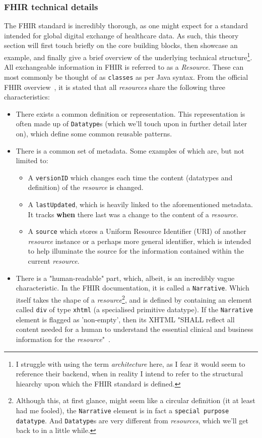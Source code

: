 \subsubsection*{FHIR technical details}
The FHIR standard is incredibly thorough, as one might expect for a standard intended for global digital exchange of healthcare data. As such, this theory section will first touch briefly on the core building blocks, then showcase an example, and finally give a brief overview of the underlying technical structure\footnote{I struggle with using the term \emph{architecture} here, as I fear it would seem to reference their backend, when in reality I intend to refer to the structural hiearchy upon which the FHIR standard is defined.}.
\\ 
All exchangeable information in FHIR is referred to as a \emph{Resource}. These can most commonly be thought of as \texttt{classes} as per Java syntax. From the official FHIR overview~\cite{FHIR-overview}, it is stated that all \emph{resources} share the following three characteristics:
\begin{itemize}
	\item There exists a common definition or representation. This representation is often made up of \texttt{Datatype}s (which we'll touch upon in further detail later on), which define some common reusable patterns.
	\item There is a common set of metadata. Some examples of which are, but not limited to:
	\begin{itemize}
		\item A \texttt{versionID} which changes each time the content (datatypes and definition) of the \emph{resource} is changed.
		\item  A \texttt{lastUpdated}, which is heavily linked to the aforementioned metadata. It tracks \textbf{when} there last was a change to the content of a \emph{resource}.
		\item A \texttt{source} which stores a Uniform Resource Identifier (URI) of another \emph{resource} instance or a perhaps more general identifier, which is intended to help illuminate the source for the information contained within the current \emph{resource}. 
	\end{itemize}
	\item There is a "human-readable" part, which, albeit, is an incredibly vague characteristic. In the FHIR documentation, it is called a \texttt{Narrative}. Which itself takes the shape of a \emph{resource}\footnote{Although this, at first glance, might seem like a circular definition (it at least had me fooled), the \texttt{Narrative} element is in fact a \texttt{special purpose datatype}. And \texttt{Datatype}s are very different from \emph{resources}, which we'll get back to in a little while.}, and is defined by containing an element called \texttt{div} of type \texttt{xhtml} (a specialised primitive datatype). If the \texttt{Narrative} element is flagged as 'non-empty', then its XHTML "SHALL reflect all content needed for a human to understand the essential clinical and business information for the \emph{resource}"~\cite{FHIR-Narrative}.
\end{itemize}

